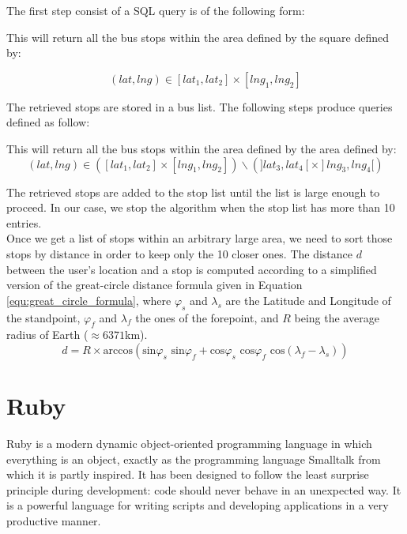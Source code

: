 The first step consist of a SQL query is of the following form:

\parbox{15cm}{

}

This will return all the bus stops within the area defined by the square defined by:

\begin{equation}
(lat, lng) \in [lat_1, lat_2]\times[lng_1, lng_2]
\end{equation}

The retrieved stops are stored in a bus list. The following steps produce queries defined as follow:

\parbox{15cm}{

}

This will return all the bus stops within the area defined by the area defined by:
\begin{equation}
(lat, lng) \in \left([lat_1, lat_2]\times[lng_1, lng_2]\right) \backslash \left(]lat_3, lat_4[\times]lng_3, lng_4[\right)
\end{equation}

The retrieved stops are added to the stop list until the list is large enough to proceed. In our case, we stop the algorithm when the stop list has more than 10 entries.\\

Once we get a list of stops within an arbitrary large area, we need to sort those stops by distance in order to keep only the 10 closer ones. The distance $d$ between the user's location and a stop is computed according to a simplified version of the great-circle distance formula given in Equation \ref{equ:great_circle_formula}, where $\varphi_s$ and $\lambda_s$ are the Latitude and Longitude of the standpoint, $\varphi_f$ and $\lambda_f$ the ones of the forepoint, and $R$ being the average radius of Earth ($\approx6371$km).\\

\begin{equation}
\label{equ:great_circle_formula}
d =  R \times \textrm{arccos}\left(\textrm{sin}\varphi_s \textrm{ sin}\varphi_f + \textrm{cos}\varphi_s \textrm{ cos}\varphi_f \textrm{ cos}(\lambda_f-\lambda_s)\right)
\end{equation}

\section{Ruby}

Ruby is a modern dynamic object-oriented programming language in which everything is an object, exactly as the programming language Smalltalk from which it is partly inspired. It has been designed to follow the least surprise principle during development: code should never behave in an unexpected way. It is a powerful language for writing scripts and developing applications in a very productive manner.\\

